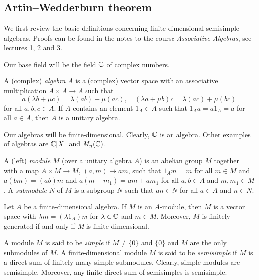 \section{}

\subsection{Artin--Wedderburn theorem}

We first review the basic definitions concerning
finite-dimensional semisimple algebras. 
Proofs can be found in the
notes to the course \emph{Associative Algebras}, see
lectures 1, 2 and 3. 

Our base field will be the field $\mathbb{C}$ of complex numbers. 

A (complex) \emph{algebra} $A$ is a (complex) vector space  
with an associative multiplication $A\times A\to A$ such that
\[
a(\lambda b+\mu c)=\lambda(ab)+\mu(ac),
\quad
(\lambda a+\mu b)c=\lambda(ac)+\mu (bc)
\]
for all $a,b,c\in A$. If $A$ contains 
an element $1_A\in A$ such that $1_Aa=a1_A=a$ for all $a\in A$, then $A$ is 
a unitary algebra. 

Our algebras will be finite-dimensional. 
Clearly, $\mathbb{C}$ is an algebra. Other 
examples of algebras are $\mathbb{C}[X]$ and $M_n(\mathbb{C})$. 

A (left) \emph{module} $M$ (over a unitary 
algebra $A$) is an abelian group $M$
together with a map $A\times M\to M$, $(a,m)\mapsto am$, such that
$1_Am=m$ for all $m\in M$ and 
$a(bm)=(ab)m$ and $a(m+m_1)=am+am_1$ for all $a,b\in A$ and $m,m_1\in M$. 
A \emph{submodule} $N$ of $M$ is a subgroup 
$N$ such that $an\in N$ for all $a\in A$ and $n\in N$. 

\begin{exercise}
Let $A$ be a finite-dimensional algebra. If $M$ 
is an $A$-module, then $M$ is a vector space with 
$\lambda m=(\lambda 1_A)m$ for $\lambda\in\mathbb{C}$ and $m\in M$. Moreover, 
$M$ is finitely generated if and only if $M$ is finite-dimensional. 
\end{exercise}

A module $M$ is said to be \emph{simple} if $M\ne\{0\}$ and $\{0\}$ and $M$ 
are the only submodules of $M$.	
A finite-dimensional module $M$  
is said to be \emph{semisimple} if $M$ is a direct sum of 
finitely many simple submodules. 
Clearly, simple modules are semisimple. Moreover, any finite direct sum of semisimples is semisimple. 


